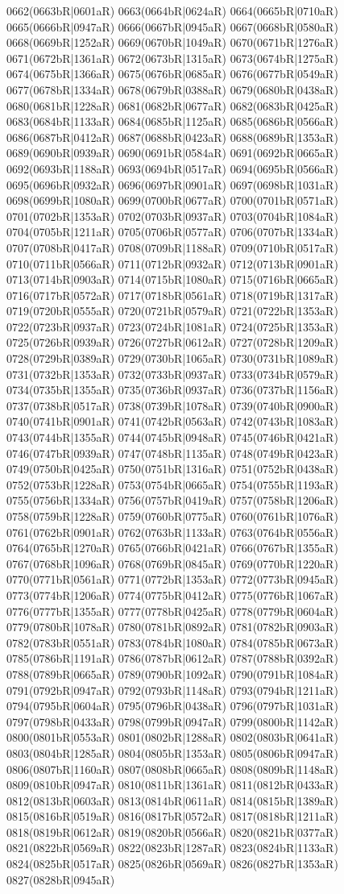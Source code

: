 0662(0663bR|0601aR) 0663(0664bR|0624aR) 0664(0665bR|0710aR) 0665(0666bR|0947aR) 0666(0667bR|0945aR) 0667(0668bR|0580aR) 0668(0669bR|1252aR) 0669(0670bR|1049aR) 0670(0671bR|1276aR) 0671(0672bR|1361aR) 0672(0673bR|1315aR) 0673(0674bR|1275aR) 0674(0675bR|1366aR) 0675(0676bR|0685aR) 0676(0677bR|0549aR) 0677(0678bR|1334aR) 0678(0679bR|0388aR) 0679(0680bR|0438aR) 0680(0681bR|1228aR) 0681(0682bR|0677aR) 0682(0683bR|0425aR) 0683(0684bR|1133aR) 0684(0685bR|1125aR) 0685(0686bR|0566aR) 0686(0687bR|0412aR) 0687(0688bR|0423aR) 0688(0689bR|1353aR) 0689(0690bR|0939aR) 0690(0691bR|0584aR) 0691(0692bR|0665aR) 0692(0693bR|1188aR) 0693(0694bR|0517aR) 0694(0695bR|0566aR) 0695(0696bR|0932aR) 0696(0697bR|0901aR) 0697(0698bR|1031aR) 0698(0699bR|1080aR) 0699(0700bR|0677aR) 0700(0701bR|0571aR) 0701(0702bR|1353aR) 0702(0703bR|0937aR) 0703(0704bR|1084aR) 0704(0705bR|1211aR) 0705(0706bR|0577aR) 0706(0707bR|1334aR) 0707(0708bR|0417aR) 0708(0709bR|1188aR) 0709(0710bR|0517aR) 0710(0711bR|0566aR) 0711(0712bR|0932aR) 0712(0713bR|0901aR) 0713(0714bR|0903aR) 0714(0715bR|1080aR) 0715(0716bR|0665aR) 0716(0717bR|0572aR) 0717(0718bR|0561aR) 0718(0719bR|1317aR) 0719(0720bR|0555aR) 0720(0721bR|0579aR) 0721(0722bR|1353aR) 0722(0723bR|0937aR) 0723(0724bR|1081aR) 0724(0725bR|1353aR) 0725(0726bR|0939aR) 0726(0727bR|0612aR) 0727(0728bR|1209aR) 0728(0729bR|0389aR) 0729(0730bR|1065aR) 0730(0731bR|1089aR) 0731(0732bR|1353aR) 0732(0733bR|0937aR) 0733(0734bR|0579aR) 0734(0735bR|1355aR) 0735(0736bR|0937aR) 0736(0737bR|1156aR) 0737(0738bR|0517aR) 0738(0739bR|1078aR) 0739(0740bR|0900aR) 0740(0741bR|0901aR) 0741(0742bR|0563aR) 0742(0743bR|1083aR) 0743(0744bR|1355aR) 0744(0745bR|0948aR) 0745(0746bR|0421aR) 0746(0747bR|0939aR) 0747(0748bR|1135aR) 0748(0749bR|0423aR) 0749(0750bR|0425aR) 0750(0751bR|1316aR) 0751(0752bR|0438aR) 0752(0753bR|1228aR) 0753(0754bR|0665aR) 0754(0755bR|1193aR) 0755(0756bR|1334aR) 0756(0757bR|0419aR) 0757(0758bR|1206aR) 0758(0759bR|1228aR) 0759(0760bR|0775aR) 0760(0761bR|1076aR) 0761(0762bR|0901aR) 0762(0763bR|1133aR) 0763(0764bR|0556aR) 0764(0765bR|1270aR) 0765(0766bR|0421aR) 0766(0767bR|1355aR) 0767(0768bR|1096aR) 0768(0769bR|0845aR) 0769(0770bR|1220aR) 0770(0771bR|0561aR) 0771(0772bR|1353aR) 0772(0773bR|0945aR) 0773(0774bR|1206aR) 0774(0775bR|0412aR) 0775(0776bR|1067aR) 0776(0777bR|1355aR) 0777(0778bR|0425aR) 0778(0779bR|0604aR) 0779(0780bR|1078aR) 0780(0781bR|0892aR) 0781(0782bR|0903aR) 0782(0783bR|0551aR) 0783(0784bR|1080aR) 0784(0785bR|0673aR) 0785(0786bR|1191aR) 0786(0787bR|0612aR) 0787(0788bR|0392aR) 0788(0789bR|0665aR) 0789(0790bR|1092aR) 0790(0791bR|1084aR) 0791(0792bR|0947aR) 0792(0793bR|1148aR) 0793(0794bR|1211aR) 0794(0795bR|0604aR) 0795(0796bR|0438aR) 0796(0797bR|1031aR) 0797(0798bR|0433aR) 0798(0799bR|0947aR) 0799(0800bR|1142aR) 0800(0801bR|0553aR) 0801(0802bR|1288aR) 0802(0803bR|0641aR) 0803(0804bR|1285aR) 0804(0805bR|1353aR) 0805(0806bR|0947aR) 0806(0807bR|1160aR) 0807(0808bR|0665aR) 0808(0809bR|1148aR) 0809(0810bR|0947aR) 0810(0811bR|1361aR) 0811(0812bR|0433aR) 0812(0813bR|0603aR) 0813(0814bR|0611aR) 0814(0815bR|1389aR) 0815(0816bR|0519aR) 0816(0817bR|0572aR) 0817(0818bR|1211aR) 0818(0819bR|0612aR) 0819(0820bR|0566aR) 0820(0821bR|0377aR) 0821(0822bR|0569aR) 0822(0823bR|1287aR) 0823(0824bR|1133aR) 0824(0825bR|0517aR) 0825(0826bR|0569aR) 0826(0827bR|1353aR) 0827(0828bR|0945aR) 
